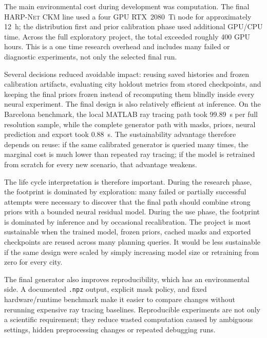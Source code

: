 The main environmental cost during development was computation. The final
\textsc{HARP-Net CKM} line used a four GPU RTX~2080~Ti node for approximately
\SI{12}{h}; the distribution first and prior calibration phase used additional
GPU/CPU time. Across the full exploratory project, the total exceeded roughly
400 GPU hours. This is a one time research overhead and includes many failed
or diagnostic experiments, not only the selected final run.

Several decisions reduced avoidable impact: reusing saved histories and frozen
calibration artifacts, evaluating city holdout metrics from stored checkpoints,
and keeping the final priors frozen instead of recomputing them blindly inside
every neural experiment. The final design is also relatively efficient at
inference. On the Barcelona benchmark, the local MATLAB ray tracing path took
\SI{99.89}{s} per full resolution sample, while the complete generator path
with masks, priors, neural prediction and export took \SI{0.88}{s}. The
sustainability advantage therefore depends on reuse: if the same calibrated
generator is queried many times, the marginal cost is much lower than repeated
ray tracing; if the model is retrained from scratch for every new scenario, that
advantage weakens.

The life cycle interpretation is therefore important. During the research phase,
the footprint is dominated by exploration: many failed or partially successful
attempts were necessary to discover that the final path should combine strong
priors with a bounded neural residual model. During the use phase, the footprint is
dominated by inference and by occasional recalibration. The project is most
sustainable when the trained model, frozen priors, cached masks and exported
checkpoints are reused across many planning queries. It would be less
sustainable if the same design were scaled by simply increasing model size or
retraining from zero for every city.

The final generator also improves reproducibility, which has an environmental
side. A documented \texttt{.npz} output, explicit mask policy, and fixed
hardware/runtime benchmark make it easier to compare changes without rerunning
expensive ray tracing baselines. Reproducible experiments are not only a
scientific requirement; they reduce wasted computation caused by ambiguous
settings, hidden preprocessing changes or repeated debugging runs.

